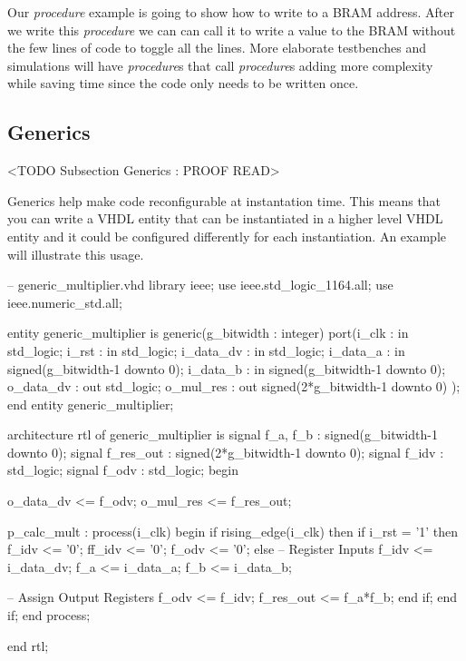 Our \emph{procedure} example is going to show how to write to a \ac{BRAM} address. After we write this \emph{procedure} we can can call it to write a value to the \ac{BRAM} without the few lines of code to toggle all the lines. More elaborate testbenches and simulations will have \emph{procedure}s that call \emph{procedure}s adding more complexity while saving time since the code only needs to be written once. 


\subsection{Generics}
	<TODO Subsection Generics : PROOF READ>

Generics help make code reconfigurable at instantation time. This means that you can write a \ac{VHDL} entity that can be instantiated in a higher level \ac{VHDL} entity and it could be configured differently for each instantiation. An example will illustrate this usage. 

\begin{VHDLlisting}[tabsize=8]
-- generic_multiplier.vhd
library ieee;
	use ieee.std_logic_1164.all;
	use ieee.numeric_std.all;
	
entity generic_multiplier is
generic(g_bitwidth : integer)
port(i_clk     : in    std_logic;
	 i_rst     : in    std_logic;
	 i_data_dv : in    std_logic;
	 i_data_a  : in    signed(g_bitwidth-1 downto 0);
	 i_data_b  : in    signed(g_bitwidth-1 downto 0);
	 o_data_dv :   out std_logic; 
	 o_mul_res :   out signed(2*g_bitwidth-1 downto 0)
);
end entity generic_multiplier;

architecture rtl of generic_multiplier is
	signal f_a, f_b  : signed(g_bitwidth-1 downto 0);
	signal f_res_out : signed(2*g_bitwidth-1 downto 0);
	signal f_idv     : std_logic;
	signal f_odv     : std_logic;
begin

	o_data_dv <= f_odv;
	o_mul_res <= f_res_out;

	p_calc_mult : process(i_clk)
	begin
		if rising_edge(i_clk) then
			if i_rst = '1' then
				f_idv  <= '0';
				ff_idv <= '0';
				f_odv  <= '0';
			else
				-- Register Inputs
				f_idv <= i_data_dv;
				f_a <= i_data_a;
				f_b <= i_data_b;
							
				-- Assign Output Registers
				f_odv <= f_idv;
				f_res_out <= f_a*f_b;		
			end if;
		end if;	
	end process;

end rtl;
	 
\end{VHDLlisting}
	
